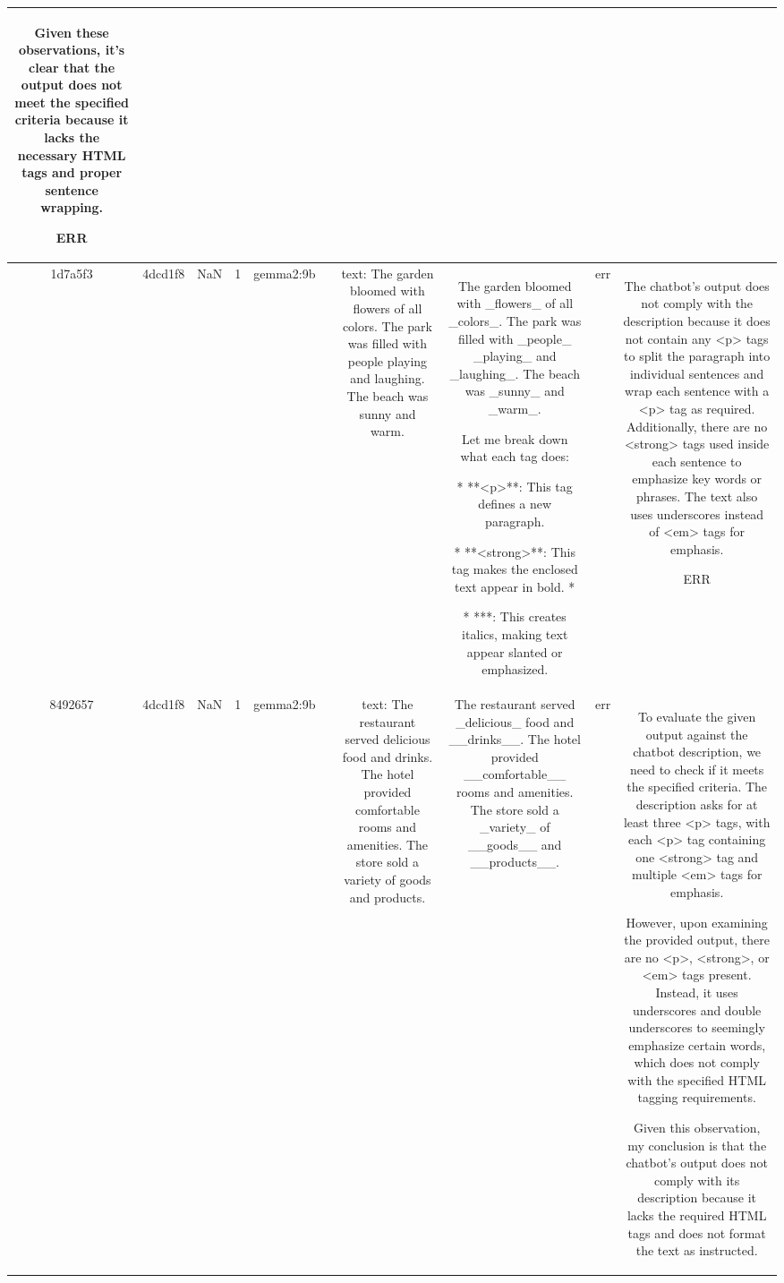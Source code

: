 \begin{table}[h!]
\begin{tabular}{|c|c|c|c|c|c|c|c|c|c|}
Given these observations, it's clear that the output does not meet the specified criteria because it lacks the necessary HTML tags and proper sentence wrapping.

ERR\\
\hline
1d7a5f3 & 4dcd1f8 & NaN & 1 & gemma2:9b &  & text: The garden bloomed with flowers of all colors. The park was filled with people playing and laughing. The beach was sunny and warm. & The garden bloomed with  _flowers_  of all _colors_. 
The park was filled with  _people_  _playing_ and _laughing_. 
The beach was _sunny_ and _warm_.   



 Let me break down what each tag does:

* **<p>**: This tag defines a new paragraph.

* **<strong>**: This tag makes the enclosed text appear in bold.  *

 * ***: This creates italics, making text appear slanted or emphasized. & err & The chatbot's output does not comply with the description because it does not contain any <p> tags to split the paragraph into individual sentences and wrap each sentence with a <p> tag as required. Additionally, there are no <strong> tags used inside each sentence to emphasize key words or phrases. The text also uses underscores instead of <em> tags for emphasis.

ERR\\
\hline
8492657 & 4dcd1f8 & NaN & 1 & gemma2:9b &  & text: The restaurant served delicious food and drinks. The hotel provided comfortable rooms and amenities. The store sold a variety of goods and products. & The restaurant served _delicious_  food and __drinks__. 
The hotel provided __comfortable__ rooms and amenities.
The store sold a _variety_ of __goods__ and __products__. 


 & err & To evaluate the given output against the chatbot description, we need to check if it meets the specified criteria. The description asks for at least three <p> tags, with each <p> tag containing one <strong> tag and multiple <em> tags for emphasis.

However, upon examining the provided output, there are no <p>, <strong>, or <em> tags present. Instead, it uses underscores and double underscores to seemingly emphasize certain words, which does not comply with the specified HTML tagging requirements.

Given this observation, my conclusion is that the chatbot's output does not comply with its description because it lacks the required HTML tags and does not format the text as instructed.


\end{tabular}
\end{table}
